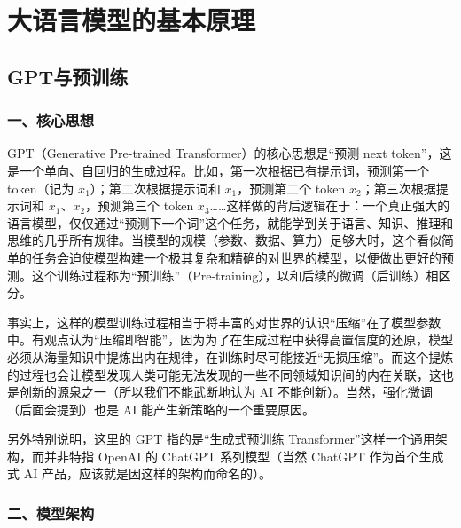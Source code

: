 \hypertarget{ux5927ux8bedux8a00ux6a21ux578bux7684ux57faux672cux539fux7406}{%
\chapter{大语言模型的基本原理}\label{ux5927ux8bedux8a00ux6a21ux578bux7684ux57faux672cux539fux7406}}

\hypertarget{gptux4e0eux9884ux8badux7ec3}{%
\section{GPT与预训练}\label{gptux4e0eux9884ux8badux7ec3}}

\hypertarget{ux4e00ux6838ux5fc3ux601dux60f3-5}{%
\subsection{一、核心思想}\label{ux4e00ux6838ux5fc3ux601dux60f3-5}}

GPT（Generative Pre-trained Transformer）的核心思想是``预测 next token''，这是一个单向、自回归的生成过程。比如，第一次根据已有提示词，预测第一个 token（记为 \(x_1\)）；第二次根据提示词和 \(x_1\)，预测第二个 token \(x_2\)；第三次根据提示词和 \(x_1\)、\(x_2\)，预测第三个 token \(x_3\)\ldots\ldots 这样做的背后逻辑在于：一个真正强大的语言模型，仅仅通过``预测下一个词''这个任务，就能学到关于语言、知识、推理和思维的几乎所有规律。当模型的规模（参数、数据、算力）足够大时，这个看似简单的任务会迫使模型构建一个极其复杂和精确的对世界的模型，以便做出更好的预测。这个训练过程称为``预训练''（Pre-training），以和后续的微调（后训练）相区分。

事实上，这样的模型训练过程相当于将丰富的对世界的认识``压缩''在了模型参数中。有观点认为``压缩即智能''，因为为了在生成过程中获得高置信度的还原，模型必须从海量知识中提炼出内在规律，在训练时尽可能接近``无损压缩''。而这个提炼的过程也会让模型发现人类可能无法发现的一些不同领域知识间的内在关联，这也是创新的源泉之一（所以我们不能武断地认为 AI 不能创新）。当然，强化微调（后面会提到）也是 AI 能产生新策略的一个重要原因。

另外特别说明，这里的 GPT 指的是``生成式预训练 Transformer''这样一个通用架构，而并非特指 OpenAI 的 ChatGPT 系列模型（当然 ChatGPT 作为首个生成式 AI 产品，应该就是因这样的架构而命名的）。

\hypertarget{ux4e8cux6a21ux578bux67b6ux6784-1}{%
\subsection{二、模型架构}\label{ux4e8cux6a21ux578bux67b6ux6784-1}}

